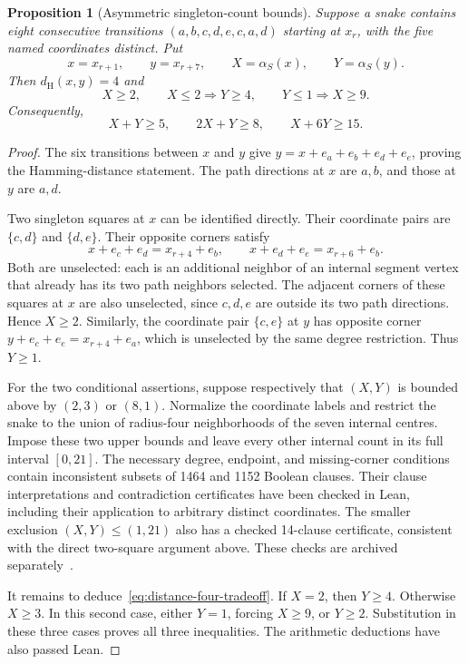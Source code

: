 \documentclass[11pt,a4paper]{article}
\newtheorem{proposition}[theorem]{Proposition}
\theoremstyle{definition}
\theoremstyle{remark}
\newcommand{\Ham}{d_{\mathrm H}}
\begin{document}
\begin{proposition}[Asymmetric singleton-count bounds]\label{prop:distance-four}
Suppose a snake contains eight consecutive transitions $(a,b,c,d,e,c,a,d)$ starting at $x_r$, with the five named coordinates distinct. Put
\[
x=x_{r+1},\qquad y=x_{r+7},\qquad X=\alpha_S(x),\qquad Y=\alpha_S(y).
\]
Then $\Ham(x,y)=4$ and
\[
X\ge2,\qquad X\le2\Longrightarrow Y\ge4,\qquad
Y\le1\Longrightarrow X\ge9.
\]
Consequently,
\begin{equation}\label{eq:distance-four-tradeoff}
X+Y\ge5,\qquad 2X+Y\ge8,\qquad X+6Y\ge15.
\end{equation}
\end{proposition}
\begin{proof}
The six transitions between $x$ and $y$ give $y=x+e_a+e_b+e_d+e_e$, proving the Hamming-distance statement. The path directions at $x$ are $a,b$, and those at $y$ are $a,d$.

Two singleton squares at $x$ can be identified directly. Their coordinate pairs are $\{c,d\}$ and $\{d,e\}$. Their opposite corners satisfy
\[
x+e_c+e_d=x_{r+4}+e_b,\qquad
x+e_d+e_e=x_{r+6}+e_b.
\]
Both are unselected: each is an additional neighbor of an internal segment vertex that already has its two path neighbors selected. The adjacent corners of these squares at $x$ are also unselected, since $c,d,e$ are outside its two path directions. Hence $X\ge2$. Similarly, the coordinate pair $\{c,e\}$ at $y$ has opposite corner $y+e_c+e_e=x_{r+4}+e_a$, which is unselected by the same degree restriction. Thus $Y\ge1$.

For the two conditional assertions, suppose respectively that $(X,Y)$ is bounded above by $(2,3)$ or $(8,1)$. Normalize the coordinate labels and restrict the snake to the union of radius-four neighborhoods of the seven internal centres. Impose these two upper bounds and leave every other internal count in its full interval $[0,21]$. The necessary degree, endpoint, and missing-corner conditions contain inconsistent subsets of 1464 and 1152 Boolean clauses. Their clause interpretations and contradiction certificates have been checked in Lean, including their application to arbitrary distinct coordinates. The smaller exclusion $(X,Y)\le(1,21)$ also has a checked 14-clause certificate, consistent with the direct two-square argument above. These checks are archived separately~\cite{pairarchive}.

It remains to deduce~\eqref{eq:distance-four-tradeoff}. If $X=2$, then $Y\ge4$. Otherwise $X\ge3$. In this second case, either $Y=1$, forcing $X\ge9$, or $Y\ge2$. Substitution in these three cases proves all three inequalities. The arithmetic deductions have also passed Lean.
\end{proof}
\end{document}
